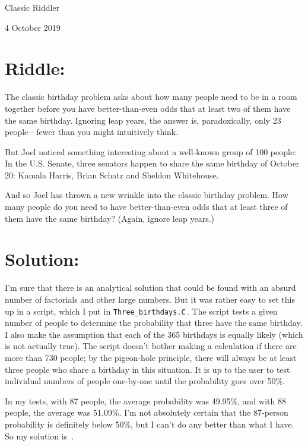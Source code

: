 \documentclass{article}
\begin{document}
\pagestyle{empty} %

\begin{center}
{\LARGE Classic Riddler}

\vspace{0.15in}

{\Large 4 October 2019}
\end{center}


\section*{Riddle:}

The classic birthday problem asks about how many people need to be in a room together before you have better-than-even odds that at least two of them have the same birthday.
Ignoring leap years, the answer is, paradoxically, only 23 people---fewer than you might intuitively think.

But Joel noticed something interesting about a well-known group of 100 people: In the U.S. Senate, three senators happen to share the same birthday of October 20: Kamala Harris, Brian Schatz and Sheldon Whitehouse.

And so Joel has thrown a new wrinkle into the classic birthday problem.
How many people do you need to have better-than-even odds that at least three of them have the same birthday?
(Again, ignore leap years.)


\section*{Solution:}

I'm sure that there is an analytical solution that could be found with an absurd number of factorials and other large numbers.
But it was rather easy to set this up in a script, which I put in \texttt{Three\_birthdays.C}\,.
The script tests a given number of people to determine the probability that three have the same birthday.
I also make the assumption that each of the 365 birthdays is equally likely (which is not actually true).
The script doesn't bother making a calculation if there are more than 730 people; by the pigeon-hole principle, there will always be at least three people who share a birthday in this situation.
It is up to the user to test individual numbers of people one-by-one until the probability goes over 50\%.

In my tests, with 87 people, the average probability was 49.95\%, and with 88 people, the average was 51.09\%.
I'm not absolutely certain that the 87-person probability is definitely below 50\%, but I can't do any better than what I have.
So my solution is
\,.
\end{document}
